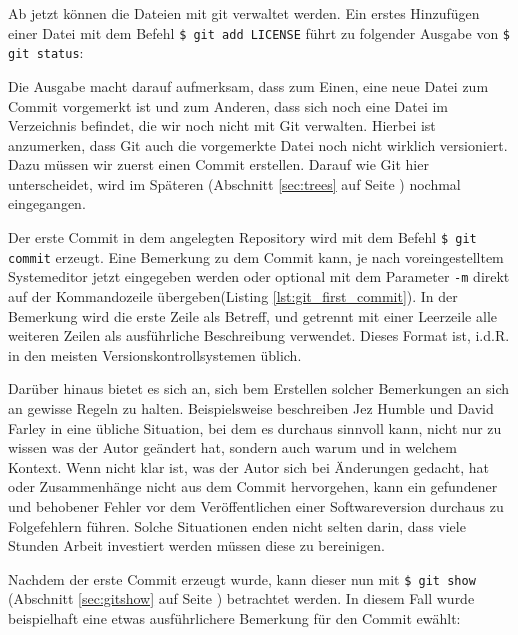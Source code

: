 

Ab jetzt können die Dateien mit \gls{git} verwaltet werden. Ein erstes
Hinzufügen einer Datei mit dem Befehl \texttt{\$ git add LICENSE} führt zu
folgender Ausgabe von \texttt{\$ git status}:



Die Ausgabe macht darauf aufmerksam, dass zum Einen, eine neue Datei zum Commit
vorgemerkt ist und zum Anderen, dass sich noch eine Datei im Verzeichnis
befindet, die wir noch nicht mit Git verwalten. Hierbei ist anzumerken, dass
Git auch die vorgemerkte Datei noch nicht wirklich versioniert. Dazu müssen wir
zuerst einen Commit erstellen. Darauf wie Git hier unterscheidet, wird im
Späteren (Abschnitt \ref{sec:trees} auf Seite \pageref{sec:trees}) nochmal
eingegangen.

Der erste Commit in dem angelegten Repository wird mit dem Befehl \texttt{\$
git commit} erzeugt. Eine Bemerkung zu dem Commit kann, je nach
voreingestelltem Systemeditor jetzt eingegeben werden oder optional mit dem
Parameter \texttt{-m} direkt auf der Kommandozeile übergeben(Listing
\ref{lst:git_first_commit}). In der Bemerkung wird die erste Zeile als Betreff,
und getrennt mit einer Leerzeile alle weiteren Zeilen als ausführliche
Beschreibung verwendet. Dieses Format ist, i.d.R. in den meisten
Versionskontrollsystemen üblich.



Darüber hinaus bietet es sich an, sich bem Erstellen solcher Bemerkungen an sich
an gewisse Regeln zu halten. Beispielsweise beschreiben Jez Humble und David
Farley in \cite[S.~37]{cd} eine übliche Situation, bei dem es durchaus sinnvoll
kann, nicht nur zu wissen was der Autor geändert hat, sondern auch warum
und in welchem Kontext. Wenn nicht klar ist, was der Autor sich bei
Änderungen gedacht, hat oder Zusammenhänge nicht aus dem Commit hervorgehen, kann
ein gefundener und behobener Fehler vor dem Veröffentlichen einer
Softwareversion durchaus zu Folgefehlern führen. Solche Situationen enden
nicht selten darin, dass viele Stunden Arbeit investiert werden müssen diese zu
bereinigen.\cite[S.~37]{cd}

Nachdem der erste Commit erzeugt wurde, kann dieser nun mit \texttt{\$ git
show} (Abschnitt \ref{sec:gitshow} auf Seite \pageref{sec:git_show}) betrachtet
werden. In diesem Fall wurde beispielhaft eine etwas ausführlichere Bemerkung
für den Commit ewählt:

